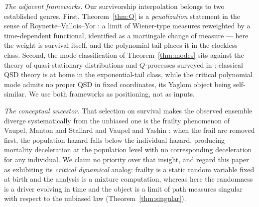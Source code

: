 \emph{The adjacent frameworks.} Our survivorship interpolation belongs
to two established genres. First, Theorem~\ref{thm:Q} is a
\emph{penalization} statement in the sense of Roynette--Vallois--Yor
\cite{RVY06}: a limit of Wiener-type measures reweighted by a
time-dependent functional, identified as a martingale change of
measure --- here the weight is survival itself, and the polynomial
tail places it in the clockless class. Second, the mode classification
of Theorem~\ref{thm:modes} sits against the theory of quasi-stationary
distributions and $Q$-processes surveyed in \cite{MV12}: classical QSD
theory is at home in the exponential-tail class, while the critical
polynomial mode admits no proper QSD in fixed coordinates, its Yaglom
object being self-similar. We use both frameworks as positioning, not
as inputs.

\emph{The conceptual ancestor.} That selection on survival makes the
observed ensemble diverge systematically from the unbiased one is the
frailty phenomenon of Vaupel, Manton and Stallard \cite{VMS79} and
Vaupel and Yashin \cite{VY85}: when the frail are removed first, the
population hazard falls below the individual hazard, producing
mortality deceleration at the population level with no corresponding
deceleration for any individual. We claim no priority over that
insight, and regard this paper as exhibiting its \emph{critical
dynamical} analog: frailty is a static random variable fixed at birth
and the analysis is a mixture computation, whereas here the randomness
is a driver evolving in time and the object is a limit of path
measures singular with respect to the unbiased law
(Theorem~\ref{thm:singular}).

